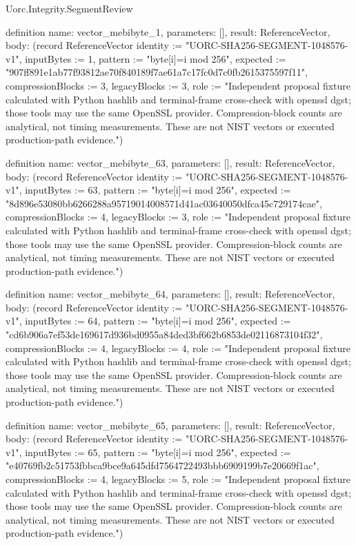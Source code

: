 \begin{lexlean}{Uorc.Integrity.SegmentReview}
\begin{semanticmodule}
definition{
  name: vector_mebibyte_1,
  parameters: [],
  result: ReferenceVector,
  body: (record ReferenceVector {identity := "UORC-SHA256-SEGMENT-1048576-v1", inputBytes := 1, pattern := "byte[i]=i mod 256", expected := "907ff891e1ab77f93812ae70f840189f7ae61a7c17fc0d7c0fb2615375597f11", compressionBlocks := 3, legacyBlocks := 3, role := "Independent proposal fixture calculated with Python hashlib and terminal-frame cross-check with openssl dgst; those tools may use the same OpenSSL provider. Compression-block counts are analytical, not timing measurements. These are not NIST vectors or executed production-path evidence."})
}

definition{
  name: vector_mebibyte_63,
  parameters: [],
  result: ReferenceVector,
  body: (record ReferenceVector {identity := "UORC-SHA256-SEGMENT-1048576-v1", inputBytes := 63, pattern := "byte[i]=i mod 256", expected := "8d896e53080bb6266288a95719014008571d41ac03640050dfca45c729174cae", compressionBlocks := 4, legacyBlocks := 3, role := "Independent proposal fixture calculated with Python hashlib and terminal-frame cross-check with openssl dgst; those tools may use the same OpenSSL provider. Compression-block counts are analytical, not timing measurements. These are not NIST vectors or executed production-path evidence."})
}

definition{
  name: vector_mebibyte_64,
  parameters: [],
  result: ReferenceVector,
  body: (record ReferenceVector {identity := "UORC-SHA256-SEGMENT-1048576-v1", inputBytes := 64, pattern := "byte[i]=i mod 256", expected := "cd6b906a7ef53de169617d936bd0955a84ded3bf662b6853de02116873104f32", compressionBlocks := 4, legacyBlocks := 4, role := "Independent proposal fixture calculated with Python hashlib and terminal-frame cross-check with openssl dgst; those tools may use the same OpenSSL provider. Compression-block counts are analytical, not timing measurements. These are not NIST vectors or executed production-path evidence."})
}

definition{
  name: vector_mebibyte_65,
  parameters: [],
  result: ReferenceVector,
  body: (record ReferenceVector {identity := "UORC-SHA256-SEGMENT-1048576-v1", inputBytes := 65, pattern := "byte[i]=i mod 256", expected := "e40769fb2c51753fbbca9bce9a645dfd7564722493bbb6909199b7e20669f1ac", compressionBlocks := 4, legacyBlocks := 5, role := "Independent proposal fixture calculated with Python hashlib and terminal-frame cross-check with openssl dgst; those tools may use the same OpenSSL provider. Compression-block counts are analytical, not timing measurements. These are not NIST vectors or executed production-path evidence."})
}


\end{semanticmodule}
\end{lexlean}
